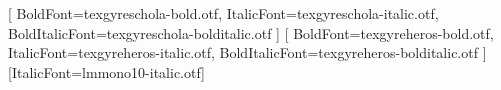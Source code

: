 
\setmainfont{texgyreschola-regular.otf}[
  BoldFont=texgyreschola-bold.otf,
  ItalicFont=texgyreschola-italic.otf,
  BoldItalicFont=texgyreschola-bolditalic.otf
]
\setsansfont{texgyreheros-regular.otf}[
  BoldFont=texgyreheros-bold.otf,
  ItalicFont=texgyreheros-italic.otf,
  BoldItalicFont=texgyreheros-bolditalic.otf
]
\setmonofont{lmmono10-regular.otf}[ItalicFont=lmmono10-italic.otf]


\settrimmedsize{297mm}{210mm}{*}
\settypeblocksize{634pt}{*}{*}
\ifdefined\ThesisPrintMode
  \setulmarginsandblock{\PrintTopMargin}{\PrintBottomMargin}{*}
  \setlrmarginsandblock{\PrintInnerMargin}{\PrintOuterMargin}{*}
\else
  \setulmargins{40mm}{*}{*}
  \setlrmarginsandblock{26.5mm}{26.5mm}{*}
\fi
\setmarginnotes{17pt}{51pt}{\onelineskip}
\setheadfoot{30pt}{2\onelineskip}
\setheaderspaces{*}{2\onelineskip}{*}
\checkandfixthelayout
\OnehalfSpacing
\raggedbottom
\frenchspacing
\setlength{\emergencystretch}{2em}


\makeatletter
\newsavebox{\CommunityChapterBox}
\newcommand{\CommunityChapterMarker}[1][4cm]{%
  \sbox{\CommunityChapterBox}{%
    \resizebox{!}{#1}{\fboxsep=1pt%
      \colorbox{ThesisGrey}{\color{white}\thechapter}}}%
  \rotatebox{90}{%
    \resizebox{\heightof{\usebox{\CommunityChapterBox}}+
      \depthof{\usebox{\CommunityChapterBox}}}{!}{\scshape\so\@chapapp}}\quad
  \raisebox{\depthof{\usebox{\CommunityChapterBox}}}{\usebox{\CommunityChapterBox}}%
}
\newcommand{\CommunityChapterNumber}[1][4cm]{%
  \sbox{\CommunityChapterBox}{\CommunityChapterMarker[#1]}%
  \makebox[0pt][c]{\makebox[1cm][r]{\usebox{\CommunityChapterBox}}}%
}

